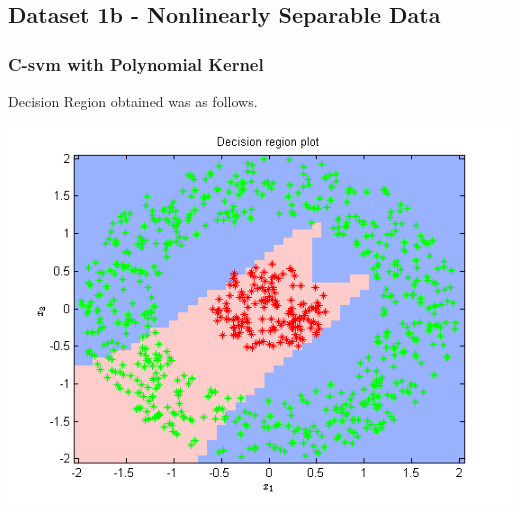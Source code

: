 \documentclass{article}
\begin{document}
\subsection{Dataset 1b - Nonlinearly Separable Data}


\subsubsection{C-svm with Polynomial Kernel}

Decision Region obtained was as follows.
\begin{center}
\includegraphics[scale=1]{Classification/1b/c_poly/dec}
\end{center}
\end{document}
